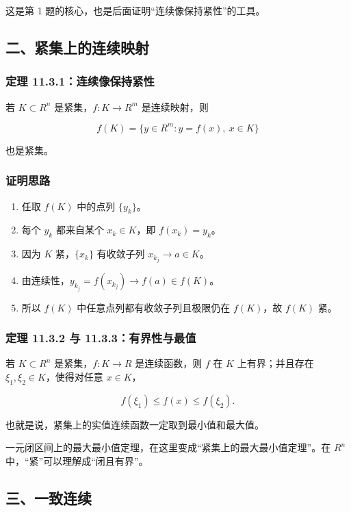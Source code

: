这是第 1 题的核心，也是后面证明“连续像保持紧性”的工具。

\subsection*{二、紧集上的连续映射}

\subsubsection*{定理 11.3.1：连续像保持紧性}

若 \(K\subset R^n\) 是紧集，\(f:K\to R^m\) 是连续映射，则

\[
      f(K)=\{y\in R^m:y=f(x),\ x\in K\}
    \]

也是紧集。

\subsubsection*{证明思路}

\begin{enumerate}
 \item 任取 \(f(K)\) 中的点列 \(\{y_k\}\)。
 \item 每个 \(y_k\) 都来自某个 \(x_k\in K\)，即 \(f(x_k)=y_k\)。
 \item 因为 \(K\) 紧，\(\{x_k\}\) 有收敛子列 \(x_{k_j}\to a\in K\)。
 \item 由连续性，\(y_{k_j}=f(x_{k_j})\to f(a)\in f(K)\)。
 \item 所以 \(f(K)\) 中任意点列都有收敛子列且极限仍在 \(f(K)\)，故 \(f(K)\) 紧。
 \end{enumerate}

\subsubsection*{定理 11.3.2 与 11.3.3：有界性与最值}

若 \(K\subset R^n\) 是紧集，\(f:K\to R\) 是连续函数，则 \(f\) 在 \(K\) 上有界；并且存在 \(\xi_1,\xi_2\in K\)，使得对任意 \(x\in K\)，

\[
      f(\xi_1)\le f(x)\le f(\xi_2).
    \]

也就是说，紧集上的实值连续函数一定取到最小值和最大值。

\begin{notebox}
一元闭区间上的最大最小值定理，在这里变成“紧集上的最大最小值定理”。在 \(R^n\) 中，“紧”可以理解成“闭且有界”。
\end{notebox}

\subsection*{三、一致连续}

